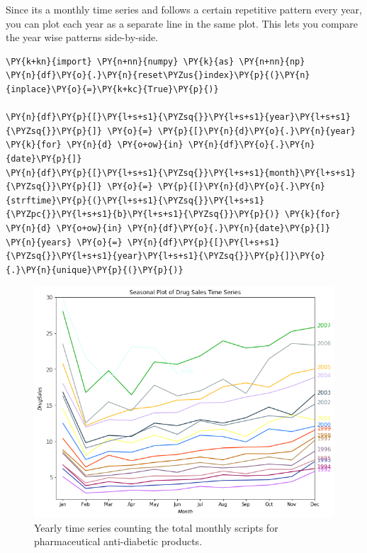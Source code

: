Since its a monthly time series and follows a certain repetitive pattern
every year, you can plot each year as a separate line in the same plot.
This lets you compare the year wise patterns side-by-side.

\begin{tcolorbox}[breakable, size=fbox, boxrule=1pt, pad at break*=1mm,colback=cellbackground, colframe=cellborder]
\begin{Verbatim}[commandchars=\\\{\}]
\PY{k+kn}{import} \PY{n+nn}{numpy} \PY{k}{as} \PY{n+nn}{np}
\PY{n}{df}\PY{o}{.}\PY{n}{reset\PYZus{}index}\PY{p}{(}\PY{n}{inplace}\PY{o}{=}\PY{k+kc}{True}\PY{p}{)}

\PY{n}{df}\PY{p}{[}\PY{l+s+s1}{\PYZsq{}}\PY{l+s+s1}{year}\PY{l+s+s1}{\PYZsq{}}\PY{p}{]} \PY{o}{=} \PY{p}{[}\PY{n}{d}\PY{o}{.}\PY{n}{year} \PY{k}{for} \PY{n}{d} \PY{o+ow}{in} \PY{n}{df}\PY{o}{.}\PY{n}{date}\PY{p}{]}
\PY{n}{df}\PY{p}{[}\PY{l+s+s1}{\PYZsq{}}\PY{l+s+s1}{month}\PY{l+s+s1}{\PYZsq{}}\PY{p}{]} \PY{o}{=} \PY{p}{[}\PY{n}{d}\PY{o}{.}\PY{n}{strftime}\PY{p}{(}\PY{l+s+s1}{\PYZsq{}}\PY{l+s+s1}{\PYZpc{}}\PY{l+s+s1}{b}\PY{l+s+s1}{\PYZsq{}}\PY{p}{)} \PY{k}{for} \PY{n}{d} \PY{o+ow}{in} \PY{n}{df}\PY{o}{.}\PY{n}{date}\PY{p}{]}
\PY{n}{years} \PY{o}{=} \PY{n}{df}\PY{p}{[}\PY{l+s+s1}{\PYZsq{}}\PY{l+s+s1}{year}\PY{l+s+s1}{\PYZsq{}}\PY{p}{]}\PY{o}{.}\PY{n}{unique}\PY{p}{(}\PY{p}{)}
\end{Verbatim}
\end{tcolorbox}

\begin{figure}[htb]
	\centering
	\includegraphics[width=0.7\linewidth]{figures/yearly_drug_dataset.png}
	\caption{Yearly time series counting the total monthly scripts for pharmaceutical anti-diabetic products.}
	\label{fig:yearly_drug_dataset}
\end{figure}
    

